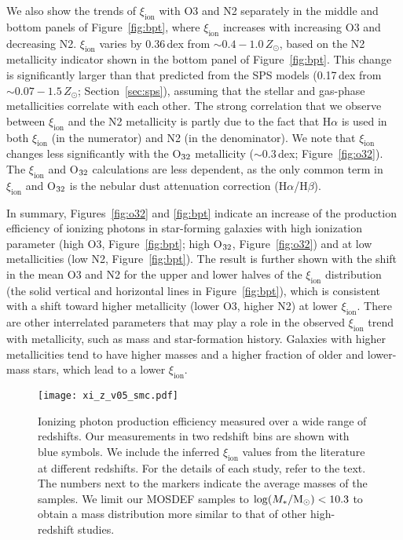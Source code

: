 \documentclass[iop]{emulateapj}
\newcommand{\xiion}{\ensuremath{\xi_{\mathrm{ion}}}}
\newcommand{\halpha}{H\ensuremath{\alpha}}
\newcommand{\hbeta}{H\ensuremath{\beta}}
\def\o32{{O$_{\rm 32}$}}
\begin{document}
We also show the trends of {\xiion} with O3 and N2 separately in the middle and bottom panels of Figure~\ref{fig:bpt}, where {\xiion} increases with increasing O3 and decreasing N2. {\xiion} varies by 0.36\,dex from $\sim 0.4-1.0\,Z_{\odot}$, based on the N2 metallicity indicator shown in the bottom panel of Figure~\ref{fig:bpt}. This change is significantly larger than that predicted from the SPS models (0.17\,dex from $\sim 0.07-1.5\,Z_{\odot}$; Section~\ref{sec:sps}), assuming that the stellar and gas-phase metallicities correlate with each other. 
The strong correlation that we observe between {\xiion} and the N2 metallicity is partly due to the fact that {\halpha} is used in both {\xiion} (in the numerator) and N2 (in the denominator).
We note that {\xiion} changes less significantly with the {\o32} metallicity ($\sim 0.3$\,dex; Figure~\ref{fig:o32}). The {\xiion} and {\o32} calculations are less dependent, as the only common term in {\xiion} and {\o32} is the nebular dust attenuation correction ({\halpha}/{\hbeta}). 

In summary, Figures~\ref{fig:o32} and \ref{fig:bpt} indicate an increase of the production efficiency of ionizing photons in star-forming galaxies with high ionization parameter (high O3, Figure~\ref{fig:bpt}; high {\o32}, Figure~\ref{fig:o32}) and at low metallicities (low N2, Figure~\ref{fig:bpt}). 
The result is further shown with the shift in the mean O3 and N2 for the upper and lower halves of the {\xiion} distribution (the solid vertical and horizontal lines in Figure~\ref{fig:bpt}), which is consistent with a shift toward higher metallicity (lower O3, higher N2) at lower {\xiion}.  
There are other interrelated parameters that may play a role in the observed {\xiion} trend with metallicity, such as mass and star-formation history. Galaxies with higher metallicities tend to have higher masses \citep[see the MOSDEF mass-metallicity study;][]{sanders16a} and a higher fraction of older and lower-mass stars, which lead to a lower {\xiion}.


\begin{figure}[tbp]
	\centering
		\texttt{[image: xi\_z\_v05\_smc.pdf]}
		\caption{Ionizing photon production efficiency measured over a wide range of redshifts. Our measurements in two redshift bins are shown with blue symbols. We include the inferred {\xiion} values from the literature at different redshifts. For the details of each study, refer to the text.
		The numbers next to the markers indicate the average masses of the samples. We limit our MOSDEF samples to $\log(M_*/{\rm M_{\odot}})<10.3$ to obtain a mass distribution more similar to that of other high-redshift studies.
		}
		\label{fig:redshift}
\end{figure}
\end{document}
